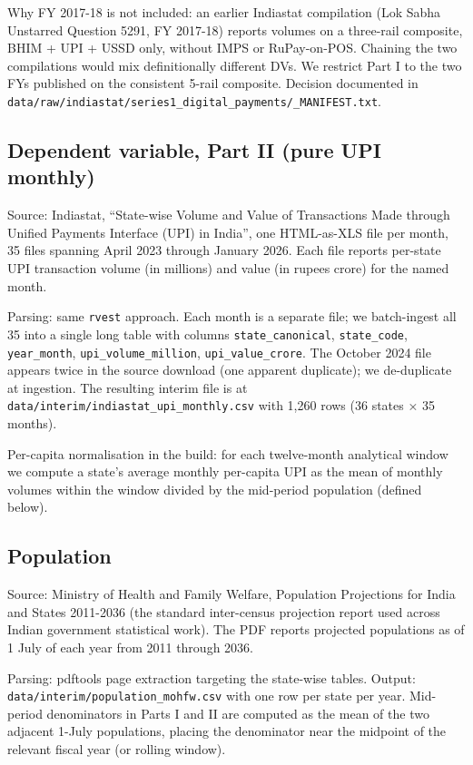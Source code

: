 \documentclass[
]{article}
\begin{document}
Why FY 2017-18 is not included: an earlier Indiastat compilation (Lok
Sabha Unstarred Question 5291, FY 2017-18) reports volumes on a
three-rail composite, BHIM + UPI + USSD only, without IMPS or
RuPay-on-POS. Chaining the two compilations would mix definitionally
different DVs. We restrict Part I to the two FYs published on the
consistent 5-rail composite. Decision documented in
\texttt{data/raw/indiastat/series1\_digital\_payments/\_MANIFEST.txt}.

\subsection{Dependent variable, Part II (pure UPI
monthly)}\label{dependent-variable-part-ii-pure-upi-monthly}

Source: Indiastat, ``State-wise Volume and Value of Transactions Made
through Unified Payments Interface (UPI) in India'', one HTML-as-XLS
file per month, 35 files spanning April 2023 through January 2026. Each
file reports per-state UPI transaction volume (in millions) and value
(in rupees crore) for the named month.

Parsing: same \texttt{rvest} approach. Each month is a separate file; we
batch-ingest all 35 into a single long table with columns
\texttt{state\_canonical}, \texttt{state\_code}, \texttt{year\_month},
\texttt{upi\_volume\_million}, \texttt{upi\_value\_crore}. The October
2024 file appears twice in the source download (one apparent duplicate);
we de-duplicate at ingestion. The resulting interim file is at
\texttt{data/interim/indiastat\_upi\_monthly.csv} with 1,260 rows (36
states × 35 months).

Per-capita normalisation in the build: for each twelve-month analytical
window we compute a state's average monthly per-capita UPI as the mean
of monthly volumes within the window divided by the mid-period
population (defined below).

\subsection{Population}\label{population}

Source: Ministry of Health and Family Welfare, Population Projections
for India and States 2011-2036 (the standard inter-census projection
report used across Indian government statistical work). The PDF reports
projected populations as of 1 July of each year from 2011 through 2036.

Parsing: pdftools page extraction targeting the state-wise tables.
Output: \texttt{data/interim/population\_mohfw.csv} with one row per
state per year. Mid-period denominators in Parts I and II are computed
as the mean of the two adjacent 1-July populations, placing the
denominator near the midpoint of the relevant fiscal year (or rolling
window).
\end{document}
